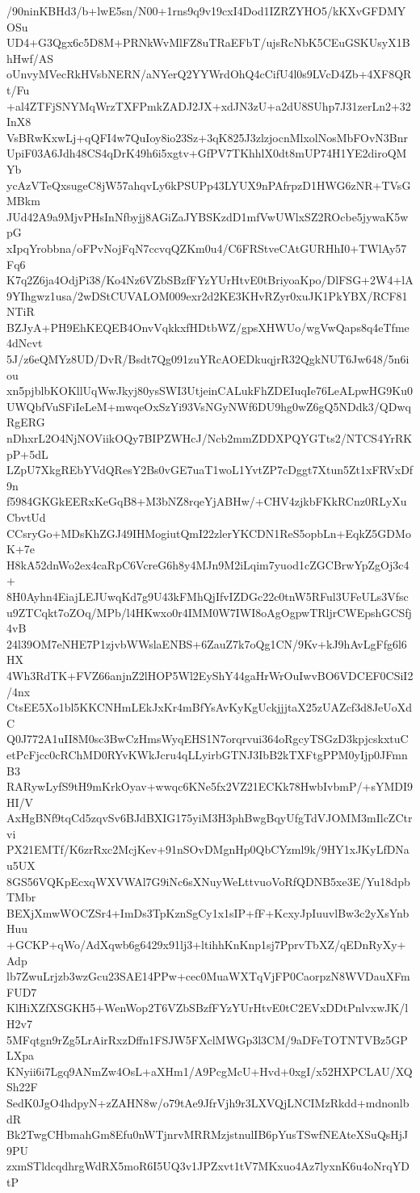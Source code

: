 /90ninKBHd3/b+lwE5sn/N00+1rns9q9v19cxI4Dod1IZRZYHO5/kKXvGFDMYOSu
UD4+G3Qgx6c5D8M+PRNkWvMlFZ8uTRaEFbT/ujsRcNbK5CEuGSKUsyX1BhHwf/AS
oUnvyMVecRkHVsbNERN/aNYerQ2YYWrdOhQ4cCifU4l0s9LVcD4Zb+4XF8QRt/Fu
+al4ZTFjSNYMqWrzTXFPmkZADJ2JX+xdJN3zU+a2dU8SUhp7J31zerLn2+32InX8
VsBRwKxwLj+qQFI4w7QuIoy8io23Sz+3qK825J3zlzjocnMlxolNosMbFOvN3Bnr
UpiF03A6Jdh48CS4qDrK49h6i5xgtv+GfPV7TKhhlX0dt8mUP74H1YE2diroQMYb
ycAzVTeQxsugeC8jW57ahqvLy6kPSUPp43LYUX9nPAfrpzD1HWG6zNR+TVsGMBkm
JUd42A9a9MjvPHsInNfbyjj8AGiZaJYBSKzdD1mfVwUWlxSZ2ROcbe5jywaK5wpG
xIpqYrobbna/oFPvNojFqN7ccvqQZKm0u4/C6FRStveCAtGURHhI0+TWlAy57Fq6
K7q2Z6ja4OdjPi38/Ko4Nz6VZbSBzfFYzYUrHtvE0tBriyoaKpo/DlFSG+2W4+lA
9YIhgwz1usa/2wDStCUVALOM009exr2d2KE3KHvRZyr0xuJK1PkYBX/RCF81NTiR
BZJyA+PH9EhKEQEB4OnvVqkkxfHDtbWZ/gpsXHWUo/wgVwQaps8q4eTfme4dNcvt
5J/z6eQMYz8UD/DvR/Bsdt7Qg091zuYRcAOEDkuqjrR32QgkNUT6Jw648/5n6iou
xn5pjblbKOKllUqWwJkyj80ysSWI3UtjeinCALukFhZDEIuqIe76LeALpwHG9Ku0
UWQbfVuSFiIeLeM+mwqeOxSzYi93VsNGyNWf6DU9hg0wZ6gQ5NDdk3/QDwqRgERG
nDhxrL2O4NjNOViikOQy7BIPZWHcJ/Ncb2mmZDDXPQYGTts2/NTCS4YrRKpP+5dL
LZpU7XkgREbYVdQResY2Bs0vGE7uaT1woL1YvtZP7cDggt7Xtun5Zt1xFRVxDf9n
f5984GKGkEERxKeGqB8+M3bNZ8rqeYjABHw/+CHV4zjkbFKkRCnz0RLyXuCbvtUd
CCsryGo+MDsKhZGJ49IHMogiutQmI22zlerYKCDN1ReS5opbLn+EqkZ5GDMoK+7e
H8kA52dnWo2ex4caRpC6VcreG6h8y4MJn9M2iLqim7yuod1cZGCBrwYpZgOj3c4+
8H0Ayhn4EiajLEJUwqKd7g9U43kFMhQjIfvIZDGc22c0tnW5RFul3UFeULs3Vfsc
u9ZTCqkt7oZOq/MPb/l4HKwxo0r4IMM0W7IWI8oAgOgpwTRljrCWEpshGCSfj4vB
24l39OM7eNHE7P1zjvbWWslaENBS+6ZauZ7k7oQg1CN/9Kv+kJ9hAvLgFfg6l6HX
4Wh3RdTK+FVZ66anjnZ2lHOP5Wl2EyShY44gaHrWrOuIwvBO6VDCEF0CSiI2/4nx
CtsEE5Xo1bl5KKCNHmLEkJxKr4mBfYsAvKyKgUckjjjtaX25zUAZcf3d8JeUoXdC
Q0J772A1uII8M0sc3BwCzHmsWyqEHS1N7orqrvui364oRgcyTSGzD3kpjcskxtuC
etPcFjcc0cRChMD0RYvKWkJcru4qLLyirbGTNJ3IbB2kTXFtgPPM0yIjp0JFmnB3
RARywLyfS9tH9mKrkOyav+wwqc6KNe5fx2VZ21ECKk78HwbIvbmP/+sYMDI9HI/V
AxHgBNf9tqCd5zqvSv6BJdBXIG175yiM3H3phBwgBqyUfgTdVJOMM3mIlcZCtrvi
PX21EMTf/K6zrRxc2McjKev+91nSOvDMgnHp0QbCYzml9k/9HY1xJKyLfDNau5UX
8GS56VQKpEcxqWXVWAl7G9iNc6sXNuyWeLttvuoVoRfQDNB5xe3E/Yu18dpbTMbr
BEXjXmwWOCZSr4+ImDs3TpKznSgCy1x1sIP+fF+KcxyJpIuuvlBw3c2yXsYnbHuu
+GCKP+qWo/AdXqwb6g6429x91lj3+ltihhKnKnp1sj7PprvTbXZ/qEDnRyXy+Adp
lb7ZwuLrjzb3wzGcu23SAE14PPw+cec0MuaWXTqVjFP0CaorpzN8WVDauXFmFUD7
KlHiXZfXSGKH5+WenWop2T6VZbSBzfFYzYUrHtvE0tC2EVxDDtPnlvxwJK/lH2v7
5MFqtgn9rZg5LrAirRxzDffn1FSJW5FXclMWGp3l3CM/9aDFeTOTNTVBz5GPLXpa
KNyii6i7Lgq9ANmZw4OsL+aXHm1/A9PcgMcU+Hvd+0xgI/x52HXPCLAU/XQSh22F
SedK0JgO4hdpyN+zZAHN8w/o79tAe9JfrVjh9r3LXVQjLNCIMzRkdd+mdnonlbdR
Bk2TwgCHbmahGm8Efu0nWTjnrvMRRMzjstnulIB6pYusTSwfNEAteXSuQsHjJ9PU
zxmSTldcqdhrgWdRX5moR6I5UQ3v1JPZxvt1tV7MKxuo4Az7lyxnK6u4oNrqYDtP
